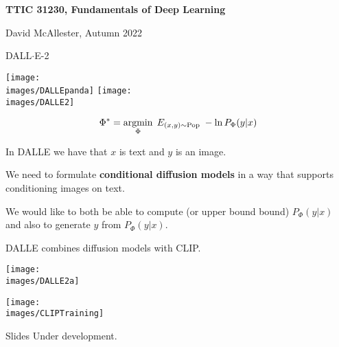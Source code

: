 





{\Huge

  \centerline{\bf TTIC 31230, Fundamentals of Deep Learning}
  \bigskip
  \centerline{David McAllester, Autumn 2022}
  \vfill
  \vfil
  \centerline{DALL$\cdot$E-2}
  \vfill
  \vfill


\centerline{\hfill \texttt{[image: \\images/DALLEpanda]} \hfill \texttt{[image: \\images/DALLE2]}}


$$\Phi^* = \operatorname*{argmin}_\Phi\;E_{(x,y) \sim \mathrm{Pop}} \;-\ln P_\Phi(y|x)$$

\vfill
In DALLE we have that $x$ is text and $y$ is an image.

\vfill
We need to formulate {\bf conditional diffusion models} in a way that supports conditioning images on text.

\vfill
We would like to both be able to compute (or upper bound bound) $P_\Phi(y|x)$ and also to generate $y$ from $P_\Phi(y|x)$.


DALLE combines diffusion models with CLIP.

\vfill

\centerline{\texttt{[image: \\images/DALLE2a]}}


\centerline{\texttt{[image: \\images/CLIPTraining]}}

\slide{}

Slides Under development.

}

